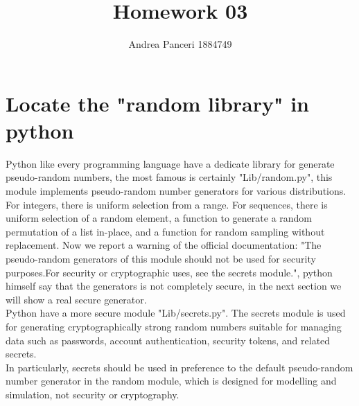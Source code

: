 \documentclass{article}
\title{Homework 03}
\author{Andrea Panceri 1884749}
\begin{document}
\maketitle

\section{Locate the "random library" in python}
Python like every programming language have a dedicate library for generate pseudo-random numbers, the most famous is certainly "Lib/random.py", this module implements pseudo-random number generators for various distributions. For integers, there is uniform selection from a range. For sequences, there is uniform selection of a random element, a function to generate a random permutation of a list in-place, and a function for random sampling without replacement. Now we report a warning of the official documentation: "The pseudo-random generators of this module should not be used for security purposes.For security or cryptographic uses, see the secrets module.", python himself say that the generators is not completely secure, in the next section we will show a real secure generator.\\
Python have a more secure module "Lib/secrets.py". The secrets module is used for generating cryptographically strong random numbers suitable for managing data such as passwords, account authentication, security tokens, and related secrets.\\
In particularly, secrets should be used in preference to the default pseudo-random number generator in the random module, which is designed for modelling and simulation, not security or cryptography.
\end{document}
